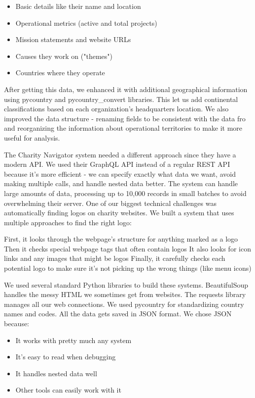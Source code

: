 \documentclass[unicode,9pt,a4paper,oneside,numbers=endperiod,openany]{scrartcl}
\begin{document}
\begin{itemize}
    \item Basic details like their name and location
    \item Operational metrics (active and total projects)
    \item Mission statements and website URLs
    \item Causes they work on ("themes")
    \item Countries where they operate
\end{itemize}

After getting this data, we enhanced it with additional geographical information using pycountry and pycountry\_convert libraries. This let us add continental classifications based on each organization's headquarters location. We also improved the data structure - renaming fields to be consistent with the data fro and reorganizing the information about operational territories to make it more useful for analysis.

The Charity Navigator system needed a different approach since they have a modern API. We used their GraphQL API instead of a regular REST API because it's more efficient - we can specify exactly what data we want, avoid making multiple calls, and handle nested data better. The system can handle large amounts of data, processing up to 10,000 records in small batches to avoid overwhelming their server.
One of our biggest technical challenges was automatically finding logos on charity websites. We built a system that uses multiple approaches to find the right logo:

First, it looks through the webpage's structure for anything marked as a logo
Then it checks special webpage tags that often contain logos
It also looks for icon links and any images that might be logos
Finally, it carefully checks each potential logo to make sure it's not picking up the wrong things (like menu icons)

We used several standard Python libraries to build these systems. BeautifulSoup handles the messy HTML we sometimes get from websites. The requests library manages all our web connections. We used pycountry for standardizing country names and codes.
All the data gets saved in JSON format. We chose JSON because:

\begin{itemize}
    \item It works with pretty much any system
    \item It's easy to read when debugging
    \item It handles nested data well
    \item Other tools can easily work with it
\end{itemize}
\end{document}

